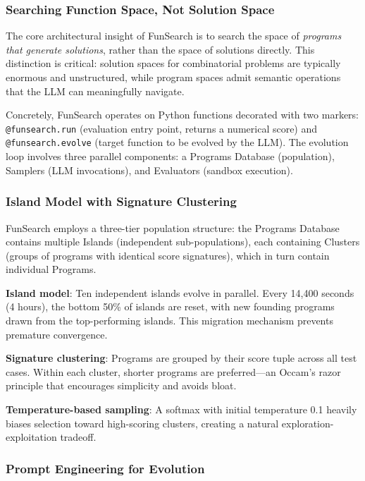 \subsubsection{Searching Function Space, Not Solution Space}

The core architectural insight of FunSearch is to search the space of \emph{programs that generate solutions}, rather than the space of solutions directly. This distinction is critical: solution spaces for combinatorial problems are typically enormous and unstructured, while program spaces admit semantic operations that the LLM can meaningfully navigate.

Concretely, FunSearch operates on Python functions decorated with two markers: \texttt{@funsearch.run} (evaluation entry point, returns a numerical score) and \texttt{@funsearch.evolve} (target function to be evolved by the LLM). The evolution loop involves three parallel components: a Programs Database (population), Samplers (LLM invocations), and Evaluators (sandbox execution).

\subsubsection{Island Model with Signature Clustering}

FunSearch employs a three-tier population structure: the Programs Database contains multiple Islands (independent sub-populations), each containing Clusters (groups of programs with identical score signatures), which in turn contain individual Programs.

\textbf{Island model}: Ten independent islands evolve in parallel. Every 14,400 seconds (4 hours), the bottom 50\% of islands are reset, with new founding programs drawn from the top-performing islands. This migration mechanism prevents premature convergence.

\textbf{Signature clustering}: Programs are grouped by their score tuple across all test cases. Within each cluster, shorter programs are preferred---an Occam's razor principle that encourages simplicity and avoids bloat.

\textbf{Temperature-based sampling}: A softmax with initial temperature 0.1 heavily biases selection toward high-scoring clusters, creating a natural exploration-exploitation tradeoff.

\subsubsection{Prompt Engineering for Evolution}

